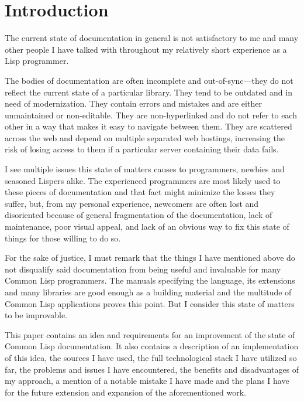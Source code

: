 \section{Introduction}

The current state of \cl{} documentation in general is not satisfactory to me and many other people I have talked with throughout my relatively short experience as a Lisp programmer.

The bodies of documentation are often incomplete and out-of-sync---they do not reflect the current state of a particular library. They tend to be outdated and in need of modernization. They contain errors and mistakes and are either unmaintained or non-editable. They are non-hyperlinked and do not refer to each other in a way that makes it easy to navigate between them. They are scattered across the web and depend on multiple separated web hostings, increasing the risk of losing access to them if a particular server containing their data fails.

I see multiple issues this state of matters causes to \cl{} programmers, newbies and seasoned Lispers alike. The experienced programmers are most likely used to these pieces of documentation and that fact might minimize the losses they suffer, but, from my personal experience, newcomers are often lost and disoriented because of general fragmentation of the documentation, lack of maintenance, poor visual appeal, and lack of an obvious way to fix this state of things for those willing to do so.

For the sake of justice, I must remark that the things I have mentioned above do not disqualify said documentation from being useful and invaluable for many Common Lisp programmers. The manuals specifying the language, its extensions and many libraries are good enough as a building material and the multitude of Common Lisp applications proves this point. But I consider this state of matters to be improvable.

This paper contains an idea and requirements for an improvement of the state of Common Lisp documentation. It also contains a description of an implementation of this idea, the sources I have used, the full technological stack I have utilized so far, the problems and issues I have encountered, the benefits and disadvantages of my approach, a mention of a notable mistake I have made and the plans I have for the future extension and expansion of the aforementioned work.
